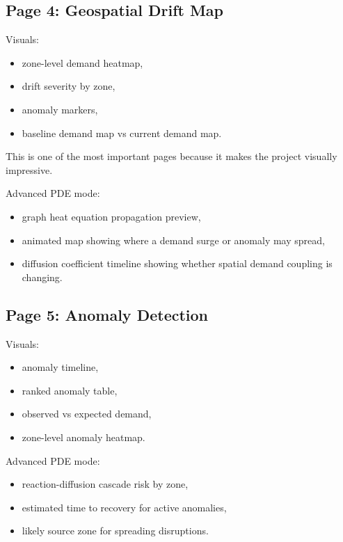\documentclass[11pt]{article}
\begin{document}
\subsection{Page 4: Geospatial Drift Map}

Visuals:

\begin{itemize}
    \item zone-level demand heatmap,
    \item drift severity by zone,
    \item anomaly markers,
    \item baseline demand map vs current demand map.
\end{itemize}

This is one of the most important pages because it makes the project visually impressive.

Advanced PDE mode:

\begin{itemize}
    \item graph heat equation propagation preview,
    \item animated map showing where a demand surge or anomaly may spread,
    \item diffusion coefficient timeline showing whether spatial demand coupling is changing.
\end{itemize}

\subsection{Page 5: Anomaly Detection}

Visuals:

\begin{itemize}
    \item anomaly timeline,
    \item ranked anomaly table,
    \item observed vs expected demand,
    \item zone-level anomaly heatmap.
\end{itemize}

Advanced PDE mode:

\begin{itemize}
    \item reaction-diffusion cascade risk by zone,
    \item estimated time to recovery for active anomalies,
    \item likely source zone for spreading disruptions.
\end{itemize}
\end{document}
